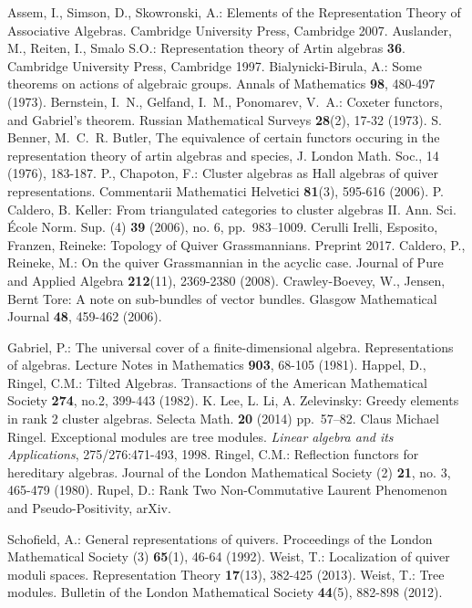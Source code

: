 \documentclass{amsart}
\begin{document}
\begin{thebibliography}{10}
Assem, I., Simson, D., Skowronski, A.: Elements of the Representation Theory of Associative Algebras. Cambridge University Press, Cambridge 2007.
 Auslander, M., Reiten, I., Smalo S.O.: Representation theory of Artin algebras {\bf 36}. Cambridge University Press, Cambridge 1997.
 Bialynicki-Birula, A.: Some theorems on actions of algebraic groups. Annals of Mathematics \textbf{98}, 480-497 (1973).
Bernstein, I.~N., Gelfand, I.~M., Ponomarev, V.~A.: Coxeter functors, and Gabriel's theorem. Russian Mathematical Surveys \textbf{28}(2), 17-32 (1973).
 S. Benner, M.~C.~R. Butler, The equivalence of certain functors occuring in the representation theory of artin algebras and species, J. London Math. Soc., 14 (1976), 183-187.
 P., Chapoton, F.: Cluster algebras as {H}all algebras of quiver representations.
Commentarii Mathematici Helvetici \textbf{81}(3), 595-616 (2006).
  P. Caldero, B. Keller: From triangulated categories to cluster algebras II.  Ann. Sci. \'Ecole Norm. Sup. (4) \textbf{39} (2006), no. 6, pp.~983--1009.
 Cerulli Irelli, Esposito, Franzen, Reineke: Topology of Quiver Grassmannians. Preprint 2017.
Caldero, P., Reineke, M.: On the quiver Grassmannian in the acyclic case.
Journal of Pure and Applied Algebra \textbf{212}(11), 2369-2380 (2008).
 Crawley-Boevey, W., Jensen, Bernt Tore: A note on sub-bundles of vector bundles. Glasgow Mathematical Journal \textbf{48}, 459-462 (2006).

 Gabriel, P.: The universal cover of a finite-dimensional algebra. Representations of algebras. Lecture Notes in Mathematics {\bf 903}, 68-105 (1981).
 Happel, D., Ringel, C.M.: Tilted Algebras. Transactions of the American Mathematical Society {\bf 274}, no.2, 399-443 (1982).
 K. Lee, L. Li, A. Zelevinsky: Greedy elements in rank 2 cluster algebras. Selecta Math. \textbf{20} (2014) pp.~57--82.
 Claus Michael Ringel. Exceptional modules are tree modules. \textit{Linear algebra and its Applications}, 275/276:471-493, 1998.
 Ringel, C.M.: Reflection functors for hereditary algebras. Journal of the London Mathematical Society (2) {\bf 21}, no. 3, 465-479 (1980).
 Rupel, D.: Rank Two Non-Commutative Laurent Phenomenon and Pseudo-Positivity, arXiv.

 Schofield, A.: General representations of quivers. Proceedings of the London Mathematical Society (3) \textbf{65}(1), 46-64 (1992).
	 Weist, T.: Localization of quiver moduli spaces. Representation Theory \textbf{17}(13), 382-425 (2013).
	 Weist, T.: Tree modules. Bulletin of the London Mathematical Society \textbf{44}(5), 882-898 (2012).
\end{thebibliography}
\end{document}
